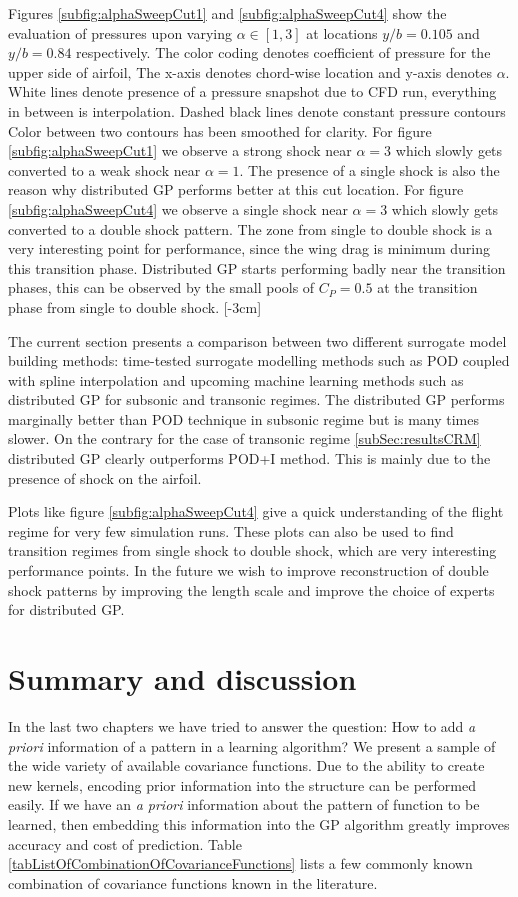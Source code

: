Figures \ref{subfig:alphaSweepCut1} and \ref{subfig:alphaSweepCut4} show the evaluation of pressures upon varying $\alpha \in [1, 3]$ at locations $y/b = 0.105$ and $y/b = 0.84$ respectively. The color coding denotes coefficient of pressure for the upper side of airfoil, The x-axis denotes chord-wise location and y-axis denotes $\alpha$. White lines denote presence of a pressure snapshot due to CFD run, everything in between is interpolation. Dashed black lines denote constant pressure contours Color between two contours has been smoothed for clarity. For figure \ref{subfig:alphaSweepCut1} we observe a strong shock near $\alpha = 3$ which slowly gets converted to a weak shock near $\alpha = 1$. The presence of a single shock is also the reason why distributed GP performs better at this cut location. For figure \ref{subfig:alphaSweepCut4} we observe a single shock near $\alpha = 3$ which slowly gets converted to a double shock pattern. The zone from single to double shock is a very interesting point for performance, since the wing drag is minimum during this transition phase. Distributed GP starts performing badly near the transition phases, this can be observed by the small pools of $C_{P} = 0.5$ at the transition phase from single to double shock. 
[-3cm]

The current section presents a comparison between two different surrogate model building methods: time-tested surrogate modelling methods such as POD coupled with spline interpolation and upcoming machine learning methods such as distributed GP for subsonic and transonic regimes. The distributed GP performs marginally better than POD technique in subsonic regime but is many times slower. On the contrary for the case of transonic regime \ref{subSec:resultsCRM} distributed GP clearly outperforms POD+I method. This is mainly due to the presence of shock on the airfoil. 

Plots like figure \ref{subfig:alphaSweepCut4} give a quick understanding of the flight regime for very few simulation runs. These plots can also be used to find transition regimes from single shock to double shock, which are very interesting performance points. In the future we wish to improve reconstruction of double shock patterns by improving the length scale and improve the choice of experts for distributed GP.

\section{Summary and discussion}\label{subsec:ExpressingStructureKernelConclusion}
In the last two chapters we have tried to answer the question: How to add \textit{a priori} information of a pattern in a learning algorithm? We present a sample of the wide variety of available covariance functions. Due to the ability to create new kernels, encoding prior information into the structure can be performed easily. If we have an \textit{a priori} information about the pattern of function to be learned, then embedding this information into the GP algorithm greatly improves accuracy and cost of prediction. Table \ref{tabListOfCombinationOfCovarianceFunctions} lists a few commonly known combination of covariance functions known in the literature. 

